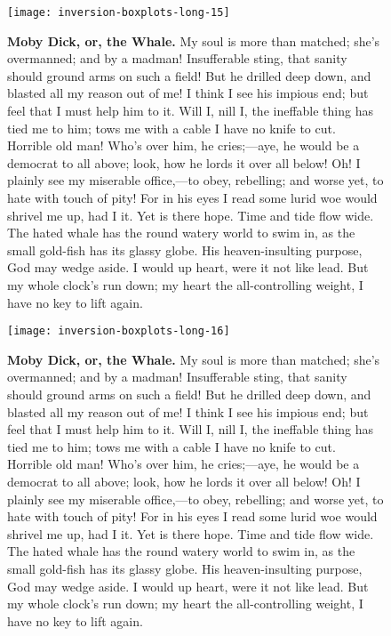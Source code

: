 \documentclass{article}
\begin{document}
\begin{figure}[!htp]
  \begin{center}
      \texttt{[image: inversion-boxplots-long-15]}
    \caption{
        \textbf{Moby Dick, or, the Whale.}
My soul is more than matched; she's overmanned; and by a madman! Insufferable sting, that sanity should ground arms on such a field! But he drilled deep down, and blasted all my reason out of me! I think I see his impious end; but feel that I must help him to it. Will I, nill I, the ineffable thing has tied me to him; tows me with a cable I have no knife to cut. Horrible old man! Who's over him, he cries;—aye, he would be a democrat to all above; look, how he lords it over all below! Oh! I plainly see my miserable office,—to obey, rebelling; and worse yet, to hate with touch of pity! For in his eyes I read some lurid woe would shrivel me up, had I it. Yet is there hope. Time and tide flow wide. The hated whale has the round watery world to swim in, as the small gold-fish has its glassy globe. His heaven-insulting purpose, God may wedge aside. I would up heart, were it not like lead. But my whole clock's run down; my heart the all-controlling weight, I have no key to lift again. 
    }
  \end{center}
\end{figure}

\begin{figure}[!htp]
  \begin{center}
      \texttt{[image: inversion-boxplots-long-16]}
    \caption{
        \textbf{Moby Dick, or, the Whale.}
My soul is more than matched; she's overmanned; and by a madman! Insufferable sting, that sanity should ground arms on such a field! But he drilled deep down, and blasted all my reason out of me! I think I see his impious end; but feel that I must help him to it. Will I, nill I, the ineffable thing has tied me to him; tows me with a cable I have no knife to cut. Horrible old man! Who's over him, he cries;—aye, he would be a democrat to all above; look, how he lords it over all below! Oh! I plainly see my miserable office,—to obey, rebelling; and worse yet, to hate with touch of pity! For in his eyes I read some lurid woe would shrivel me up, had I it. Yet is there hope. Time and tide flow wide. The hated whale has the round watery world to swim in, as the small gold-fish has its glassy globe. His heaven-insulting purpose, God may wedge aside. I would up heart, were it not like lead. But my whole clock's run down; my heart the all-controlling weight, I have no key to lift again. 
    }
  \end{center}
\end{figure}
\end{document}

